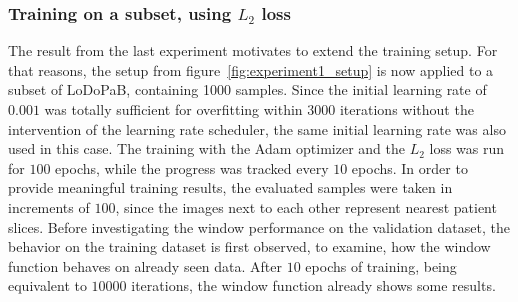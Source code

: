 \documentclass[12pt,a4paper]{article}
\begin{document}
 \subsubsection{Training on a subset, using $L_2$ loss}
 The result from the last experiment motivates to extend the training setup. For that reasons, the setup from figure~\ref{fig:experiment1_setup} is now applied to a subset of LoDoPaB, containing 1000 samples. Since the initial learning rate of $0.001$ was totally sufficient for overfitting within $3000$ iterations without the intervention of the learning rate scheduler, the same initial learning rate was also used in this case. The training with the Adam optimizer and the $L_2$ loss was run for $100$ epochs, while the progress was tracked every $10$ epochs. In order to provide meaningful training results, the evaluated samples were taken in increments of $100$, since the images next to each other represent nearest patient slices. Before investigating the window performance on the validation dataset, the behavior on the training dataset is first observed, to examine, how the window function behaves on already seen data.
 \newline\newline
 After $10$ epochs of training, being equivalent to $10000$ iterations, the window function already shows some results. 
\end{document}
